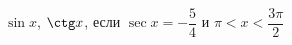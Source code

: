 \begin{ex}[type=calculate]
	\begin{condition}
		\( \sin x \), \( \ctg x \), \quad если \( \sec x=-\dfrac{5}{4} \) и \( \pi<x<\dfrac{3\pi}{2} \)
	\end{condition}
\end{ex}